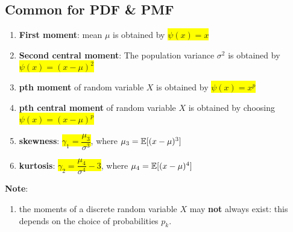 \subsection{Common for PDF \& PMF}

\begin{enumerate}
    \item \textbf{First moment}: mean $\mu$ is obtained by \colorbox{yellow}{$\psi(x)=x$}
    \hfill \cite{statistics/book/Statistics-for-Data-Scientists/Maurits-Kaptein}

    \item \textbf{Second central moment}: The population variance $\sigma^ 2$ is obtained by \colorbox{yellow}{$\psi(x)=(x -\mu)^2$}
    \hfill \cite{statistics/book/Statistics-for-Data-Scientists/Maurits-Kaptein}

    \item \textbf{pth moment} of random variable $X$ is obtained by \colorbox{yellow}{$\psi(x) = x^p$}
    \hfill \cite{statistics/book/Statistics-for-Data-Scientists/Maurits-Kaptein}

    \item \textbf{pth central moment} of random variable $X$ is obtained by choosing \colorbox{yellow}{$\psi(x) = (x - \mu)^p$}
    \hfill \cite{statistics/book/Statistics-for-Data-Scientists/Maurits-Kaptein}

    \item \textbf{skewness}: \colorbox{yellow}{$\gamma_1 = \dfrac{\mu_3}{\sigma^3}$}, where $\mu_3 = \mathbb{E}[(x-\mu)^3]$
    \hfill \cite{statistics/book/Statistics-for-Data-Scientists/Maurits-Kaptein}

    \item \textbf{kurtosis}: \colorbox{yellow}{$\gamma_2 = \dfrac{\mu_4}{\sigma^4} - 3$}, where $\mu_4 = \mathbb{E}[(x-\mu)^4]$
    \hfill \cite{statistics/book/Statistics-for-Data-Scientists/Maurits-Kaptein}
\end{enumerate}

\vspace{0.5cm}
\textbf{Note}:
\begin{enumerate}
    \item the moments of a discrete random variable $X$ may \textbf{not} always exist: this depends on the choice of probabilities $p _k $.
    \hfill \cite{statistics/book/Statistics-for-Data-Scientists/Maurits-Kaptein}
\end{enumerate}











